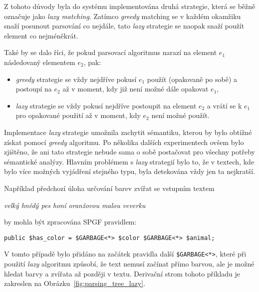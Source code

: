 Z tohoto důvody byla do systému implementována druhá strategie, která se běžně označuje jako \emph{lazy matching}.
Zatímco \emph{greedy} matching se v každém okamžiku snaží posunout parsování co nejdále, tato \emph{lazy} strategie se naopak snaží použít element co nejméněkrát.

Také by se dalo říci, že pokud parsovací algoritmus narazí na element $e_{1}$ následovaný elementem $e_{2}$, pak:
\begin{itemize}
	\item \emph{greedy} strategie se vždy nejdříve pokusí $e_{1}$ použít (opakovaně po sobě) a postoupí na $e_{2}$ až v moment, kdy
	      již není možné dále opakovat $e_{1}$,
	\item \emph{lazy} strategie se vždy pokusí nejdříve postoupit na element $e_{2}$ a vrátí se k $e_{1}$ pro opakované použití až v moment,
	      kdy $e_{2}$ není možné použít.
\end{itemize}

Implementace \emph{lazy} strategie umožnila zachytit sémantiku, kterou by bylo obtížné získat pomocí \emph{greedy} algoritmu.
Po několika dalších experimentech ovšem bylo zjištěno, že ani tato strategie nebude sama o sobě postačovat pro všechny potřeby sémantické analýzy.
Hlavním problémem s \emph{lazy} strategií bylo to, že v textech, kde bylo více možných vyjádření stejného typu, byla detekována vždy jen ta nejkratší.

Například předchozí úloha určování barev zvířat se vstupním textem
\begin{center}
	\emph{velký hnědý pes honí oranžovou malou veverku}
\end{center}
by mohla být zpracována SPGF pravidlem:
\begin{center}
	\texttt{public \$has\_color = \$GARBAGE<*> \$color \$GARBAGE<*> \$animal;}
\end{center}
V tomto případě bylo přidáno na začátek pravidla další \texttt{\$GARBAGE<*>}, které při použití \emph{lazy} algoritmu způsobí,
že text nemusí začínat přímo barvou, ale je možné hledat barvy a zvířata až později v textu.
Derivační strom tohoto příkladu je zakreslen na Obrázku~\ref{fig:parsing_tree_lazy}.

